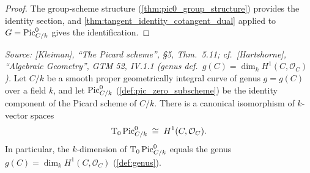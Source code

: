 \begin{proof}\leanok
  The group-scheme structure (\cref{thm:pic0_group_structure})
  provides the identity section, and
  \cref{thm:tangent_identity_cotangent_dual} applied to
  \(G = \operatorname{Pic}^0_{C/k}\) gives the identification.
\end{proof}


\begin{theorem}\leanok
  \label{thm:pic0_tangent_space_iso}

  \textit{Source: [Kleiman], ``The Picard scheme'', \S 5,
  Thm.~5.11; cf.\ [Hartshorne], ``Algebraic Geometry'', GTM 52,
  IV.1.1 (genus def.\ \(g(C) = \dim_k H^1(C, \mathcal{O}_C)\)).}
  Let \(C/k\) be a smooth proper geometrically integral curve of genus
  \(g = g(C)\) over a field \(k\), and let \(\operatorname{Pic}^0_{C/k}\)
  (\cref{def:pic_zero_subscheme}) be the identity component of the
  Picard scheme of \(C/k\). There is a canonical isomorphism of
  \(k\)-vector spaces
  \[
    \textup T_0 \operatorname{Pic}^0_{C/k} \;\cong\; H^1(C, \mathcal{O}_C).
  \]
  In particular, the \(k\)-dimension of \(\textup T_0 \operatorname{Pic}^0_{C/k}\) equals
  the genus \(g(C) = \dim_k H^1(C, \mathcal{O}_C)\)
  (\cref{def:genus}).
\end{theorem}

